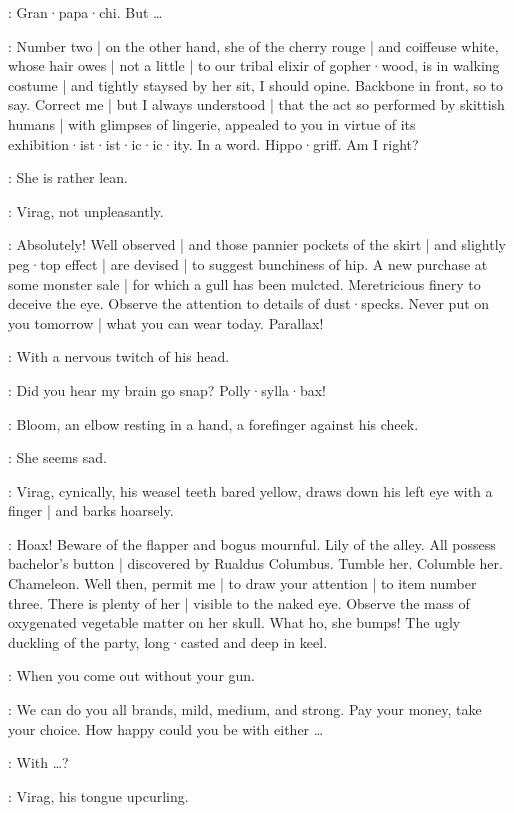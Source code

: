 \Bloom:
Gran·papa·chi.
But \ldots

\Virag:
Number two |
on the other hand,
she of the cherry rouge |
and coiffeuse white,%
whose hair owes |
not a little |
to our tribal elixir of gopher·wood,
is in walking costume |
and tightly staysed by her sit,
I should opine.
Backbone in front,
so to say.
Correct me |
but I always understood |
that the act so performed by skittish humans |
with glimpses of lingerie,
appealed to you in virtue of its exhibition·ist·ist·ic·ic·ity.
In a word.
Hippo·griff.
Am I right?

\Bloom:
She is rather lean.

:
Virag,
not unpleasantly.

\Virag:
Absolutely!
Well observed |
and those pannier pockets of the skirt |
and slightly peg·top effect |
are devised |
to suggest bunchiness of hip.
A new purchase at some monster sale |
for which a gull has been mulcted.
Meretricious finery to deceive the eye.
Observe the attention to details of dust·specks.
Never put on you tomorrow |
what you can wear today.
Parallax!

:
With a nervous twitch of his head.

\Virag:
Did you hear my brain go snap?
Polly·sylla·bax!

:
Bloom,
an elbow resting in a hand,
a forefinger against his cheek.

\Bloom:
She seems sad.

:
Virag,
cynically,
his weasel teeth bared yellow,
draws down his left eye with a finger |
and barks hoarsely.

\Virag:
Hoax!
Beware of the flapper and bogus mournful.
Lily of the alley.
All possess bachelor's button |
discovered by Rualdus Columbus.
Tumble her.
Columble her.
Chameleon.
Well then,
permit me |
to draw your attention |
to item number three.
There is plenty of her |
visible to the naked eye.
Observe the mass of oxygenated vegetable matter on her skull.
What ho,
she bumps!
The ugly duckling of the party,
long·casted and deep in keel.

\Bloom:
When you come out without your gun.

\Virag:
We can do you all brands,
mild,
medium,
and strong.
Pay your money,
take your choice.
How happy could you be with either \ldots

\Bloom:
With \ldots?

:
Virag,
his tongue upcurling.

